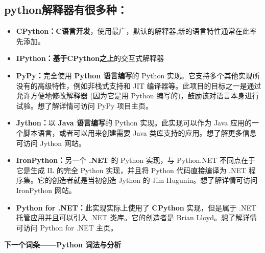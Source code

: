 \subsection{python解释器有很多种：}

\begin{itemize}
\item \textbf{CPython：}\textbf{C语言开发}，使用最广，默认的解释器,新的语言特性通常在此率先添加。

\item \textbf{IPython：}\textbf{基于CPython之上}的交互式解释器

\item \textbf{PyPy：}完全使用 \textbf{Python 语言编写}的 Python 实现。它支持多个其他实现所没有的高级特性，例如非栈式支持和 JIT 编译器等。此项目的目标之一是通过允许方便地修改解释器 (因为它是用 Python 编写的)，鼓励该对语言本身进行试验。想了解详情可访问 PyPy 项目主页。

\item \textbf{Jython：}以 \textbf{Java 语言编写}的 Python 实现。此实现可以作为 Java 应用的一个脚本语言，或者可以用来创建需要 Java 类库支持的应用。想了解更多信息可访问 Jython 网站。

\item \textbf{IronPython：}另一个 \textbf{.NET} 的 Python 实现，与 Python.NET 不同点在于它是生成 IL 的完全 Python 实现，并且将 Python 代码直接编译为 .NET 程序集。它的创造者就是当初创造 Jython 的 Jim Hugunin。想了解详情可访问 IronPython 网站。

\item \textbf{Python for .NET：}此实现实际上使用了 \textbf{CPython} 实现，但是属于 .NET 托管应用并且可以引入 .NET 类库。它的创造者是 Brian Lloyd。想了解详情可访问 Python for .NET 主页。
\end{itemize}

\textbf{下一个词条——Python 词法与分析}
